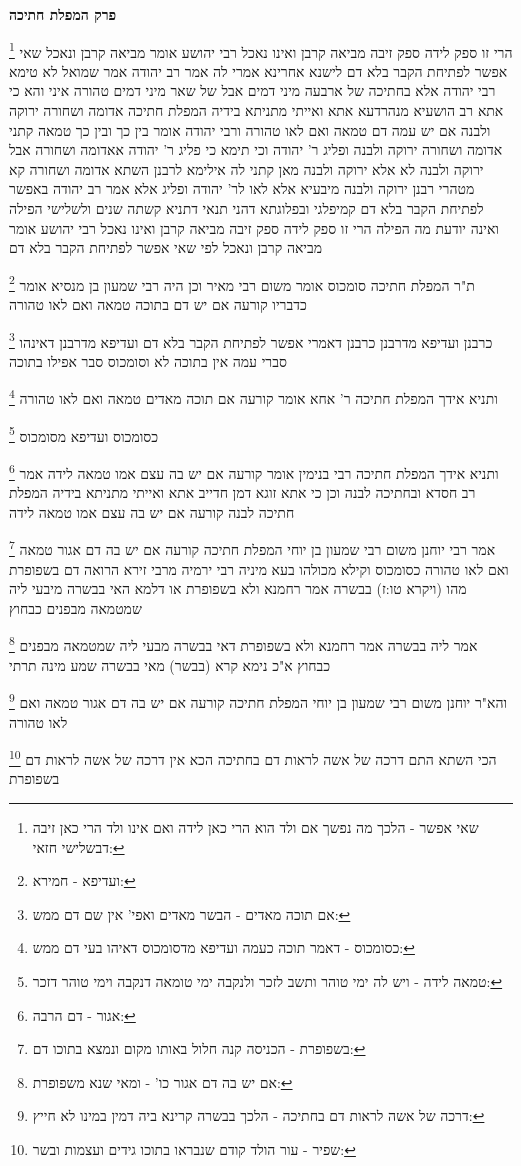 \documentclass[12pt, openany]{book}
\newcommand{\sethebfont}{
\fontsize{10.5pt}{21.0pt} \selectfont
}
\newcommand{\twocol}[1]{
	{\sethebfont \begin{multicols}{2}
			#1
	\end{multicols}}	
}
\newcommand{\chapname}{}
\newcommand{\newchap}[1]{
	\addcontentsline{toc}{chapter}{#1}
	\renewcommand{\chapname}{#1}
		\begin{center}
			\textbf{%
\fontsize{16pt}{16pt}\selectfont
				#1}
		\end{center}
}
\newcommand{\footnotecomment}[1]{
	\renewcommand\thefootnote{}
	\footnote{#1}}
\newcommand{\commenta}[1]{\footnotecomment{#1}}
\begin{document}
{\newchap{פרק  המפלת חתיכה}
\twocol{
\commenta{שאי אפשר - הלכך מה נפשך אם ולד הוא הרי כאן לידה ואם אינו ולד הרי כאן זיבה דבשלישי חזאי:}
הרי זו ספק לידה ספק זיבה מביאה קרבן ואינו נאכל 
רבי יהושע אומר מביאה קרבן ונאכל שאי אפשר לפתיחת הקבר בלא דם 
לישנא אחרינא אמרי לה אמר רב יהודה אמר שמואל לא טימא רבי יהודה אלא בחתיכה של ארבעה מיני דמים אבל של שאר מיני דמים טהורה 
איני והא כי אתא רב הושעיא מנהרדעא אתא ואייתי מתניתא בידיה המפלת חתיכה אדומה ושחורה ירוקה ולבנה אם יש עמה דם טמאה ואם לאו טהורה ורבי יהודה אומר בין כך ובין כך טמאה 
קתני אדומה ושחורה ירוקה ולבנה ופליג ר' יהודה 
וכי תימא כי פליג ר' יהודה אאדומה ושחורה אבל ירוקה ולבנה לא אלא ירוקה ולבנה מאן קתני לה 
אילימא לרבנן השתא אדומה ושחורה קא מטהרי רבנן ירוקה ולבנה מיבעיא אלא לאו לר' יהודה ופליג
אלא אמר רב יהודה באפשר לפתיחת הקבר בלא דם קמיפלגי ובפלוגתא דהני תנאי דתניא קשתה שנים ולשלישי הפילה ואינה יודעת מה הפילה הרי זו ספק לידה ספק זיבה מביאה קרבן ואינו נאכל 
רבי יהושע אומר מביאה קרבן ונאכל לפי שאי אפשר לפתיחת הקבר בלא דם 
\commenta{ועדיפא - חמירא:}
ת"ר המפלת חתיכה סומכוס אומר משום רבי מאיר וכן היה רבי שמעון בן מנסיא אומר כדבריו קורעה אם יש דם בתוכה טמאה ואם לאו טהורה 
\commenta{אם תוכה מאדים - הבשר מאדים ואפי' אין שם דם ממש:}
כרבנן ועדיפא מדרבנן כרבנן דאמרי אפשר לפתיחת הקבר בלא דם ועדיפא מדרבנן דאינהו סברי עמה אין בתוכה לא וסומכוס סבר אפילו בתוכה 
\commenta{כסומכוס - דאמר תוכה כעמה ועדיפא מדסומכוס דאיהו בעי דם ממש:}
ותניא אידך המפלת חתיכה ר' אחא אומר קורעה אם תוכה מאדים טמאה ואם לאו טהורה 
\commenta{טמאה לידה - ויש לה ימי טוהר ותשב לזכר ולנקבה ימי טומאה דנקבה וימי טוהר דזכר:}
כסומכוס ועדיפא מסומכוס 
\commenta{אגור - דם הרבה:}
ותניא אידך המפלת חתיכה רבי בנימין אומר קורעה אם יש בה עצם אמו טמאה לידה אמר רב חסדא ובחתיכה לבנה וכן כי אתא זוגא דמן חדייב אתא ואייתי מתניתא בידיה המפלת חתיכה לבנה קורעה אם יש בה עצם אמו טמאה לידה 
\commenta{בשפופרת - הכניסה קנה חלול באותו מקום ונמצא בתוכו דם:}
אמר רבי יוחנן משום רבי שמעון בן יוחי המפלת חתיכה קורעה אם יש בה דם אגור טמאה ואם לאו טהורה כסומכוס וקילא מכולהו 
בעא מיניה רבי ירמיה מרבי זירא הרואה דם בשפופרת מהו (ויקרא טו:ז) בבשרה אמר רחמנא ולא בשפופרת או דלמא האי בבשרה מיבעי ליה שמטמאה מבפנים כבחוץ 
\commenta{אם יש בה דם אגור כו' - ומאי שנא משפופרת:}
אמר ליה בבשרה אמר רחמנא ולא בשפופרת דאי בבשרה מבעי ליה שמטמאה מבפנים כבחוץ א"כ נימא קרא (בבשר) מאי בבשרה שמע מינה תרתי 
\commenta{דרכה של אשה לראות דם בחתיכה - הלכך בבשרה קרינא ביה דמין במינו לא חייץ:}
והא"ר יוחנן משום רבי שמעון בן יוחי המפלת חתיכה קורעה אם יש בה דם אגור טמאה ואם לאו טהורה 
\commenta{שפיר - עור הולד קודם שנבראו בתוכו גידים ועצמות ובשר:}
הכי השתא התם דרכה של אשה לראות דם בחתיכה הכא אין דרכה של אשה לראות דם בשפופרת 
}}
\end{document}
